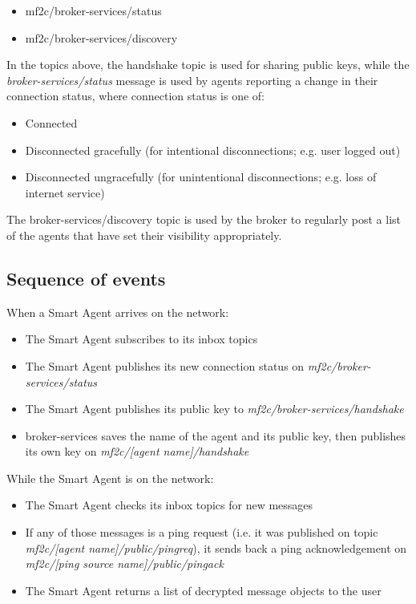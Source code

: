 \documentclass{article}
\begin{document}
\begin{itemize}
    \item mf2c/broker-services/status
    \item mf2c/broker-services/discovery
\end{itemize}


In the topics above, the handshake topic is used for sharing public keys, while the \textit{broker-services/status} message is used by agents reporting a change in their connection status, where connection status is one of:
\begin{itemize}
    \item Connected
    \item Disconnected gracefully (for intentional disconnections; e.g. user logged out)
    \item Disconnected ungracefully (for unintentional disconnections; e.g. loss of internet service)
\end{itemize}

The broker-services/discovery topic is used by the broker to regularly post a list of the agents that have set their visibility appropriately. 

\subsection{Sequence of events}

When a Smart Agent arrives on the network:
\begin{itemize}
    \item The Smart Agent subscribes to its inbox topics
    \item The Smart Agent publishes its new connection status on \textit{mf2c/broker-services/status}
    \item The Smart Agent publishes its public key to \textit{mf2c/broker-services/handshake}
    \item broker-services saves the name of the agent and its public key, then publishes its own key on \textit{mf2c/[agent name]/handshake}
\end{itemize}

While the Smart Agent is on the network:
\begin{itemize}
    \item The Smart Agent checks its inbox topics for new messages
    \item If any of those messages is a ping request (i.e. it was published on topic \textit{mf2c/[agent name]/public/pingreq}), it sends back a ping acknowledgement on \textit{mf2c/[ping source name]/public/pingack}
    \item The Smart Agent returns a list of decrypted message objects to the user
\end{itemize}
\end{document}
